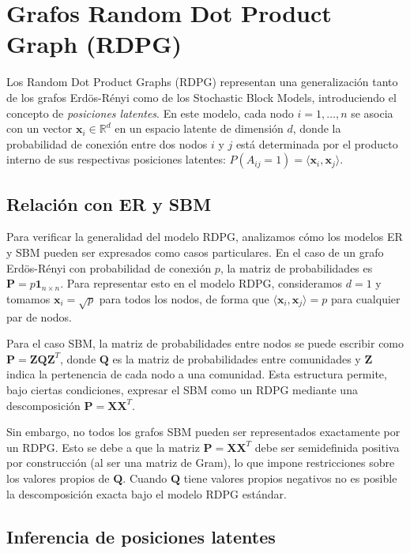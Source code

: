 \documentclass{article}
\begin{document}
\FloatBarrier
\section{Grafos Random Dot Product Graph (RDPG)}
\label{sec:rdpg}

Los Random Dot Product Graphs (RDPG) representan una generalización tanto de los grafos Erdös-Rényi como de los Stochastic Block Models, introduciendo el concepto de \emph{posiciones latentes}. En este modelo, cada nodo $i = 1, \ldots, n$ se asocia con un vector $\mathbf{x}_i \in \mathbb{R}^d$ en un espacio latente de dimensión $d$, donde la probabilidad de conexión entre dos nodos $i$ y $j$ está determinada por el producto interno de sus respectivas posiciones latentes: $P(A_{ij} = 1) = \langle \mathbf{x}_i, \mathbf{x}_j \rangle$.

\subsection{Relación con ER y SBM}

Para verificar la generalidad del modelo RDPG, analizamos cómo los modelos ER y SBM pueden ser expresados como casos particulares. En el caso de un grafo Erdös-Rényi con probabilidad de conexión $p$, la matriz de probabilidades es $\mathbf{P} = p \mathbf{1}_{n \times n}$. Para representar esto en el modelo RDPG, consideramos $d=1$ y tomamos $\mathbf{x}_i = \sqrt{p}$ para todos los nodos, de forma que $\langle \mathbf{x}_i, \mathbf{x}_j \rangle = p$ para cualquier par de nodos.

Para el caso SBM, la matriz de probabilidades entre nodos se puede escribir como $\mathbf{P} = \mathbf{Z}\mathbf{Q}\mathbf{Z}^T$, donde $\mathbf{Q}$ es la matriz de probabilidades entre comunidades y $\mathbf{Z}$ indica la pertenencia de cada nodo a una comunidad. Esta estructura permite, bajo ciertas condiciones, expresar el SBM como un RDPG mediante una descomposición $\mathbf{P} = \mathbf{X}\mathbf{X}^T$.

Sin embargo, no todos los grafos SBM pueden ser representados exactamente por un RDPG. Esto se debe a que la matriz $\mathbf{P} = \mathbf{X}\mathbf{X}^T$ debe ser semidefinida positiva por construcción (al ser una matriz de Gram), lo que impone restricciones sobre los valores propios de $\mathbf{Q}$. Cuando $\mathbf{Q}$ tiene valores propios negativos no es posible la descomposición exacta bajo el modelo RDPG estándar.

\subsection{Inferencia de posiciones latentes}
\end{document}
